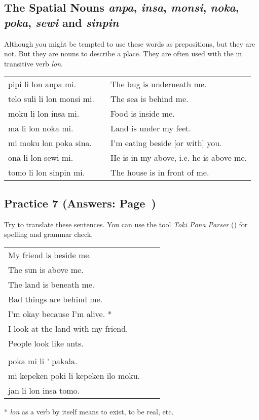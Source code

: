 \subsection*{The Spatial Nouns \textit{anpa}, \textit{insa}, \textit{monsi}, \textit{noka}, \textit{poka}, \textit{sewi} and \textit{sinpin}}
%
Although you might be tempted to use these words as prepositions, but they are not. 
But they are nouns to describe a place.
They are often used with the in transitive verb \textit{lon}. 

\begin{supertabular}{p{5,5cm}|ll}
pipi li lon anpa mi.       && The bug is underneath me. \\
telo suli li lon monsi mi. && The sea is behind me.  \\
moku li lon insa mi.       && Food is inside me. \\
ma li lon noka mi.         && Land is under my feet. \\
mi moku lon poka sina.     && I'm eating beside [or with] you. \\
ona li lon sewi mi.        && He is in my above, i.e. he is above me. \\
tomo li lon sinpin mi.     && The house is in front of me. \\
\end{supertabular} 
%
%
\subsection*{Practice 7 (Answers: Page~\pageref{'other_prepositions'})}
%
Try to translate these sentences. 
You can use the tool \textit{Toki Pona Parser} (\cite{www:rowa:02}) for spelling and grammar check. 

\begin{supertabular}{p{5,5cm}|ll}
My friend is beside me. && \\ %
The sun is above me. && \\ %
The land is beneath me. && \\ %
Bad things are behind me. && \\ %
I'm okay because I'm alive. * && \\ %
I look at the land with my friend. && \\ %
People look like ants. && \\ %
 && \\ %
poka mi li ' pakala. && \\ %
mi kepeken poki li kepeken ilo moku. && \\ %
jan li lon insa tomo. && \\ %
\end{supertabular} 

* \textit{lon} as a verb by itself means to exist, to be real, etc. 
% 
